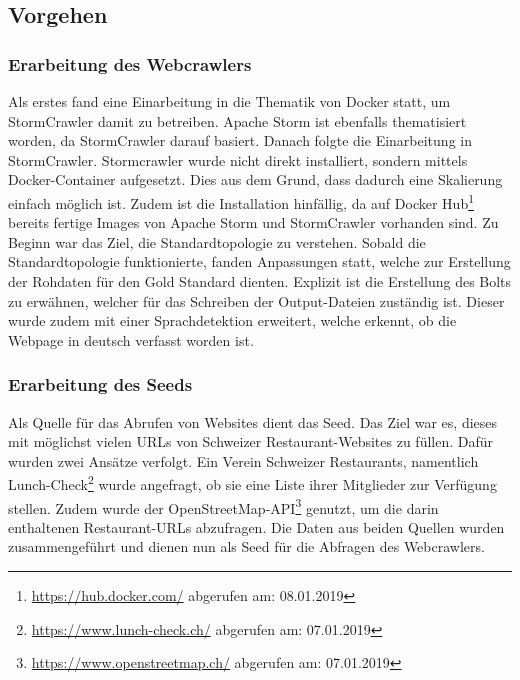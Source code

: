 \subsection{Vorgehen}
\subsubsection{Erarbeitung des Webcrawlers}
Als erstes fand eine Einarbeitung in die Thematik von Docker statt, um StormCrawler damit zu betreiben.
Apache Storm ist ebenfalls thematisiert worden, da StormCrawler darauf basiert.
Danach folgte die Einarbeitung in StormCrawler.
Stormcrawler wurde nicht direkt installiert, sondern mittels Docker-Container aufgesetzt.
Dies aus dem Grund, dass dadurch eine Skalierung einfach möglich ist.
Zudem ist die Installation hinfällig, da auf Docker Hub\footnote{\url{https://hub.docker.com/} abgerufen am: 08.01.2019} bereits fertige Images von Apache Storm und StormCrawler vorhanden sind.
Zu Beginn war das Ziel, die Standardtopologie zu verstehen.
Sobald die Standardtopologie funktionierte, fanden Anpassungen statt, welche zur Erstellung der Rohdaten für den Gold Standard dienten.
Explizit ist die Erstellung des Bolts zu erwähnen, welcher für das Schreiben der Output-Dateien zuständig ist.
Dieser wurde zudem mit einer Sprachdetektion erweitert, welche erkennt, ob die Webpage in deutsch verfasst worden ist.
\subsubsection{Erarbeitung des Seeds}
Als Quelle für das Abrufen von Websites dient das Seed.
Das Ziel war es, dieses mit möglichst vielen URLs von Schweizer Restaurant-Websites zu füllen.
Dafür wurden zwei Ansätze verfolgt.
Ein Verein Schweizer Restaurants, namentlich Lunch-Check\footnote{\url{https://www.lunch-check.ch/} abgerufen am: 07.01.2019} wurde angefragt, ob sie eine Liste ihrer Mitglieder zur Verfügung stellen.
Zudem wurde der OpenStreetMap-API\footnote{\url{https://www.openstreetmap.ch/} abgerufen am: 07.01.2019} genutzt, um die darin enthaltenen Restaurant-URLs abzufragen.
Die Daten aus beiden Quellen wurden zusammengeführt und dienen nun als Seed für die Abfragen des Webcrawlers.

